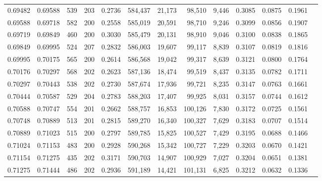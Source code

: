 \begin{tabular}{rrrrrrrrrrrrr}
0.69482 & 0.69588 &   539 & 203 &                                     0.2736 & 584,437 &  21,173 &  98,510 &   9,446 & 0.3085 & 0.0875 & 0.1961 \\
0.69588 & 0.69718 &   582 & 200 &                                     0.2558 & 585,019 &  20,591 &  98,710 &   9,246 & 0.3099 & 0.0856 & 0.1907 \\
0.69719 & 0.69849 &   460 & 200 &                                     0.3030 & 585,479 &  20,131 &  98,910 &   9,046 & 0.3100 & 0.0838 & 0.1865 \\
0.69849 & 0.69995 &   524 & 207 &                                     0.2832 & 586,003 &  19,607 &  99,117 &   8,839 & 0.3107 & 0.0819 & 0.1816 \\
0.69995 & 0.70175 &   565 & 200 &                                     0.2614 & 586,568 &  19,042 &  99,317 &   8,639 & 0.3121 & 0.0800 & 0.1764 \\
0.70176 & 0.70297 &   568 & 202 &                                     0.2623 & 587,136 &  18,474 &  99,519 &   8,437 & 0.3135 & 0.0782 & 0.1711 \\
0.70297 & 0.70443 &   538 & 202 &                                     0.2730 & 587,674 &  17,936 &  99,721 &   8,235 & 0.3147 & 0.0763 & 0.1661 \\
0.70444 & 0.70587 &   529 & 204 &                                     0.2783 & 588,203 &  17,407 &  99,925 &   8,031 & 0.3157 & 0.0744 & 0.1612 \\
0.70588 & 0.70747 &   554 & 201 &                                     0.2662 & 588,757 &  16,853 & 100,126 &   7,830 & 0.3172 & 0.0725 & 0.1561 \\
0.70748 & 0.70889 &   513 & 201 &                                     0.2815 & 589,270 &  16,340 & 100,327 &   7,629 & 0.3183 & 0.0707 & 0.1514 \\
0.70889 & 0.71023 &   515 & 200 &                                     0.2797 & 589,785 &  15,825 & 100,527 &   7,429 & 0.3195 & 0.0688 & 0.1466 \\
0.71024 & 0.71153 &   483 & 200 &                                     0.2928 & 590,268 &  15,342 & 100,727 &   7,229 & 0.3203 & 0.0670 & 0.1421 \\
0.71154 & 0.71275 &   435 & 202 &                                     0.3171 & 590,703 &  14,907 & 100,929 &   7,027 & 0.3204 & 0.0651 & 0.1381 \\
0.71275 & 0.71444 &   486 & 202 &                                     0.2936 & 591,189 &  14,421 & 101,131 &   6,825 & 0.3212 & 0.0632 & 0.1336 \\

\end{tabular}
